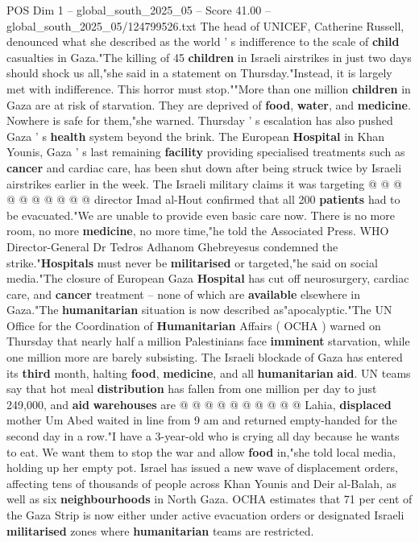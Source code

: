 \begin{textsample}{POS Dim 1 – global\_south\_2025\_05 – Score 41.00 – global\_south\_2025\_05/124799526.txt}
The head of UNICEF, Catherine Russell, denounced what she described as the world ' s indifference to the scale of \textbf{child} casualties in Gaza."The killing of 45 \textbf{children} in Israeli airstrikes in just two days should shock us all,"she said in a statement on Thursday."Instead, it is largely met with indifference.
This horror must stop.""More than one million \textbf{children} in Gaza are at risk of starvation.
They are deprived of \textbf{food}, \textbf{water}, and \textbf{medicine}.
Nowhere is safe for them,"she warned.
Thursday ' s escalation has also pushed Gaza ' s \textbf{health} system beyond the brink.
The European \textbf{Hospital} in Khan Younis, Gaza ' s last remaining \textbf{facility} providing specialised treatments such as \textbf{cancer} and cardiac care, has been shut down after being struck twice by Israeli airstrikes earlier in the week.
The Israeli military claims it was targeting @ @ @ @ @ @ @ @ @ @ director Imad al-Hout confirmed that all 200 \textbf{patients} had to be evacuated."We are unable to provide even basic care now.
There is no more room, no more \textbf{medicine}, no more time,"he told the Associated Press.
WHO Director-General Dr Tedros Adhanom Ghebreyesus condemned the strike."\textbf{Hospitals} must never be \textbf{militarised} or targeted,"he said on social media."The closure of European Gaza \textbf{Hospital} has cut off neurosurgery, cardiac care, and \textbf{cancer} treatment -- none of which are \textbf{available} elsewhere in Gaza."The \textbf{humanitarian} situation is now described as"apocalyptic."The UN Office for the Coordination of \textbf{Humanitarian} Affairs ( OCHA ) warned on Thursday that nearly half a million Palestinians face \textbf{imminent} starvation, while one million more are barely subsisting.
The Israeli blockade of Gaza has entered its \textbf{third} month, halting \textbf{food}, \textbf{medicine}, and all \textbf{humanitarian} \textbf{aid}.
UN teams say that hot meal \textbf{distribution} has fallen from one million per day to just 249,000, and \textbf{aid} \textbf{warehouses} are @ @ @ @ @ @ @ @ @ @ Lahia, \textbf{displaced} mother Um Abed waited in line from 9 am and returned empty-handed for the second day in a row."I have a 3-year-old who is crying all day because he wants to eat.
We want them to stop the war and allow \textbf{food} in,"she told local media, holding up her empty pot.
Israel has issued a new wave of displacement orders, affecting tens of thousands of people across Khan Younis and Deir al-Balah, as well as six \textbf{neighbourhoods} in North Gaza.
OCHA estimates that 71 per cent of the Gaza Strip is now either under active evacuation orders or designated Israeli \textbf{militarised} zones where \textbf{humanitarian} teams are restricted.

\end{textsample}
